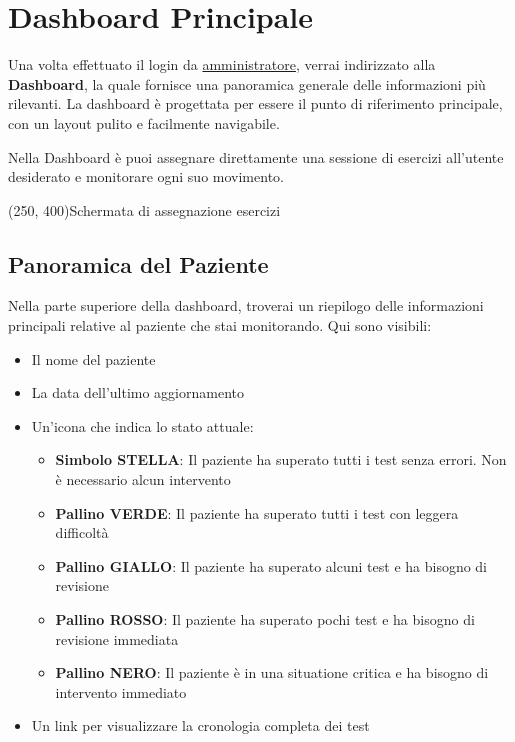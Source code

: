 \documentclass[a4paper,12pt]{book}
\begin{document}
	\section{Dashboard Principale}
	Una volta effettuato il login da \href{https://mnemosinefe.it/admin/login}{amministratore}, verrai indirizzato alla \textbf{Dashboard}, la quale fornisce una panoramica generale delle informazioni più rilevanti. La dashboard è progettata per essere il punto di riferimento principale, con un layout pulito e facilmente navigabile.
	
	Nella Dashboard è puoi assegnare direttamente una sessione di esercizi all'utente desiderato e monitorare ogni suo movimento.
	
	\begin{center}
		\framebox(250, 400){Schermata di assegnazione esercizi}
	\end{center}
	
	\subsection{Panoramica del Paziente}
	Nella parte superiore della dashboard, troverai un riepilogo delle informazioni principali relative al paziente che stai monitorando. Qui sono visibili:
	\begin{itemize}
		\item Il nome del paziente
		\item La data dell'ultimo aggiornamento
		\item Un'icona che indica lo stato attuale: \begin{itemize}
			\item \textbf{Simbolo STELLA}: Il paziente ha superato tutti i test senza errori. Non è necessario alcun intervento
			\item \textbf{Pallino VERDE}: Il paziente ha superato tutti i test con leggera difficoltà
			\item \textbf{Pallino GIALLO}: Il paziente ha superato alcuni test e ha bisogno di revisione
			\item \textbf{Pallino ROSSO}: Il paziente ha superato pochi test e ha bisogno di revisione immediata
			\item \textbf{Pallino NERO}: Il paziente è in una situatione critica e ha bisogno di intervento immediato
		\end{itemize}
		\item Un link per visualizzare la cronologia completa dei test
	\end{itemize}
	
\end{document}
